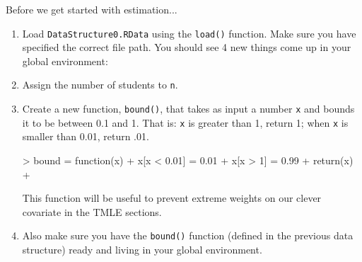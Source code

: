 \documentclass[answers]{exam}
\newenvironment{packed_item}{
\begin{itemize}
 \setlength{\itemsep}{0pt}
  \setlength{\parskip}{0pt}
  \setlength{\parsep}{0pt}
}{\end{itemize}}
\begin{document}
\noindent Before we get started with estimation...
\begin{enumerate}
\item Load \texttt{DataStructure0.RData} using the \texttt{load()} function. Make sure you have specified the correct file path. You should see 4 new things come up in your global environment:


\item Assign the number of students to \texttt{n}.
\item Create a new function, \texttt{bound()}, that takes as input a number \texttt{x} and bounds it to be between 0.1 and 1. That is: \texttt{x} is greater than 1, return 1; when \texttt{x} is smaller than 0.01, return .01.
\begin{Schunk}
\begin{Sinput}
> bound = function(x){
+   x[x < 0.01] = 0.01
+   x[x > 1] = 0.99
+   return(x)
+ }
\end{Sinput}
\end{Schunk}
This function will be useful to prevent extreme weights on our clever covariate in the TMLE sections.
\item Also make sure you have the \texttt{bound()} function (defined in the previous data structure) ready and living in your global environment.
\end{enumerate}
\end{document}

